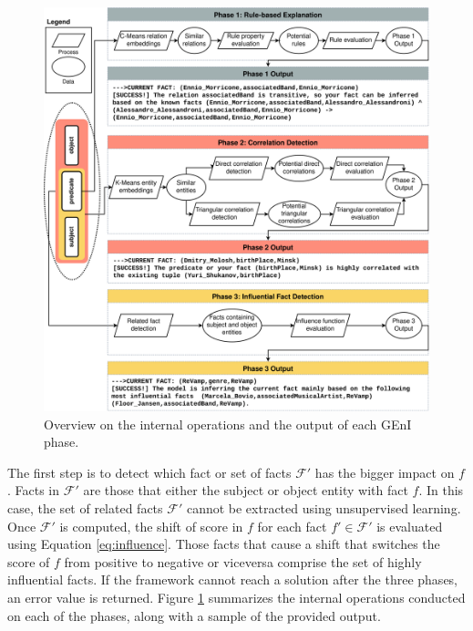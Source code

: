 \begin{figure}[t]
    \centering
    \includegraphics[width=.9\linewidth]{6_kbsextractiondl/figures/Data_Flow_GEnI.eps}
    \caption{Overview on the internal operations and the output of each GEnI phase.}
    \label{fig:phases_geni_overview}
\end{figure}

The first step is to detect which fact or set of facts $\mathcal{F}'$ has the bigger impact on $f$. Facts in $\mathcal{F}'$ are those that either the subject or object entity with fact $f$. In this case, the set of related facts $\mathcal{F}'$ cannot be extracted using unsupervised learning. Once $\mathcal{F}'$ is computed, the shift of score in $f$ for each fact $f' \in \mathcal{F}'$ is evaluated using Equation \ref{eq:influence}. Those facts that cause a shift that switches the score of $f$ from positive to negative or viceversa comprise the set of highly influential facts. If the framework cannot reach a solution after the three phases, an error value is returned. Figure \ref{fig:phases_geni_overview} summarizes the internal operations conducted on each of the phases, along with a sample of the provided output.  

